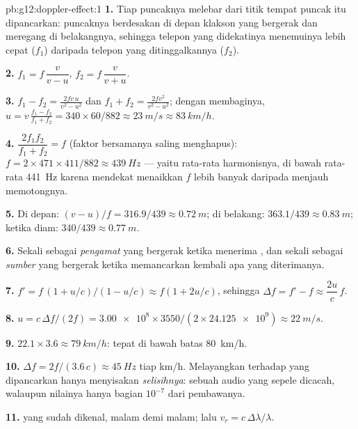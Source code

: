 \begin{solution}{pb:g12:doppler-effect:1}
\textbf{1.} Tiap puncaknya melebar dari titik tempat puncak itu dipancarkan: puncaknya
berdesakan di depan klakson yang bergerak dan meregang di belakangnya, sehingga telepon
yang didekatinya menemuinya lebih cepat ($f_1$) daripada telepon yang ditinggalkannya
($f_2$).

\textbf{2.} $f_1 = f\,\dfrac{v}{v - u}$, \quad $f_2 = f\,\dfrac{v}{v + u}$.

\textbf{3.} $f_1 - f_2 = \frac{2fv\,u}{v^2 - u^2}$ dan $f_1 + f_2 =
\frac{2fv^2}{v^2 - u^2}$; dengan membaginya, $u = v\,\frac{f_1 - f_2}{f_1 + f_2} =
340 \times 60/882 \approx \qty{23}{m/s} \approx \qty{83}{km/h}$.

\textbf{4.} $\dfrac{2f_1 f_2}{f_1 + f_2} = f$ (faktor bersamanya saling menghapus):
$f = 2 \times 471 \times 411/882 \approx \qty{439}{Hz}$ --- yaitu rata-rata harmonisnya, di
bawah rata-rata \qty{441}{Hz} karena mendekat menaikkan $f$ lebih banyak daripada menjauh
memotongnya.

\textbf{5.} Di depan: $(v - u)/f = 316.9/439 \approx \qty{0.72}{m}$; di belakang:
$363.1/439 \approx \qty{0.83}{m}$; ketika diam: $340/439 \approx \qty{0.77}{m}$.

\textbf{6.} Sekali sebagai \emph{pengamat} yang bergerak ketika menerima , dan
sekali sebagai \emph{sumber} yang bergerak ketika memancarkan kembali apa yang
diterimanya.

\textbf{7.} $f' = f\,(1 + u/c)/(1 - u/c) \approx f(1 + 2u/c)$, sehingga
$\Delta f = f' - f \approx \dfrac{2u}{c}\,f$.

\textbf{8.} $u = c\,\Delta f/(2f) = \num{3.00e8} \times 3550/(2 \times \num{24.125e9})
\approx \qty{22}{m/s}$.

\textbf{9.} $22.1 \times 3.6 \approx \qty{79}{km/h}$: tepat di bawah batas
\qty{80}{km/h}.

\textbf{10.} $\Delta f = 2f/(3.6\,c) \approx \qty{45}{Hz}$ tiap \unit{km/h}. Melayangkan
 terhadap  yang dipancarkan hanya menyisakan \emph{selisihnya}: sebuah
 audio yang sepele dicacah, walaupun nilainya hanya bagian $10^{-7}$ dari
pembawanya.

\textbf{11.}   yang sudah dikenal, malam demi malam; lalu
$v_r = c\,\Delta\lambda/\lambda$.


\end{solution}
